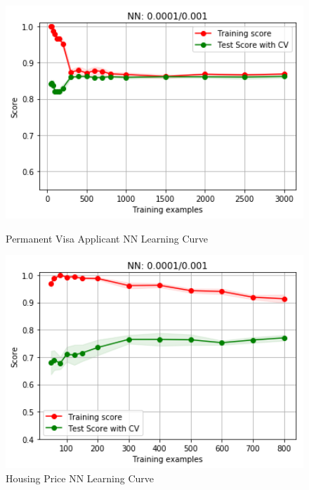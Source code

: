 \documentclass[h]{article}
\begin{document}
\begin{figure}[H]
      \includegraphics[width=1\textwidth,keepaspectratio]{1_nn.png} 
      \caption*{Permanent Visa Applicant NN Learning Curve} 
   \endminipage\hfill
      \includegraphics[width=1\textwidth,keepaspectratio]{2_nn.png} 
      \caption*{Housing Price NN Learning Curve} 
   \endminipage\hfill
\end{figure}
\end{document}
